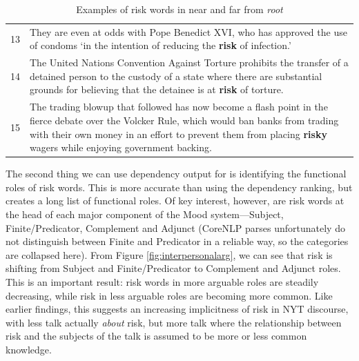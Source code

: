 \begin{table}
\begin{tabularx}{\linewidth}{p{}p{}}
    13   & They are even at odds with Pope Benedict XVI, who has approved the use of condoms `in the intention of reducing the \textbf{risk} of infection.'   \\ 
    14   &  The United Nations Convention Against Torture prohibits the transfer of a detained person to the custody of a state where there are substantial grounds for believing that the detainee is at \textbf{risk} of torture. \\ 
    15    &  The trading blowup that followed has now become a flash point in the fierce debate over the Volcker Rule, which would ban banks from trading with their own money in an effort to prevent them from placing \textbf{risky} wagers while enjoying government backing.  \\ 
    \bottomrule

    \end{tabularx}
    \caption{Examples of risk words in near and far from \emph{root}}
    \label{conc:distanceroot}
    \end{table}


    The second thing we can use dependency output for is identifying the functional roles of risk words. This is more accurate than using the dependency ranking, but creates a long list of functional roles. Of key interest, however, are risk words at the head of each major component of the Mood system---Subject, Finite\slash Predicator, Complement and Adjunct (CoreNLP parses unfortunately do not distinguish between Finite and Predicator in a reliable way, so the categories are collapsed here). From Figure \ref{fig:interpersonalarg}, we can see that risk is shifting from Subject and Finite\slash Predicator to Complement and Adjunct roles. This is an important result: risk words in more arguable roles are steadily decreasing, while risk in less arguable roles are becoming more common. Like earlier findings, this suggests an increasing implicitness of risk in NYT discourse, with less talk actually \emph{about} risk, but more talk where the relationship between risk and the subjects of the talk is assumed to be more or less common knowledge.

